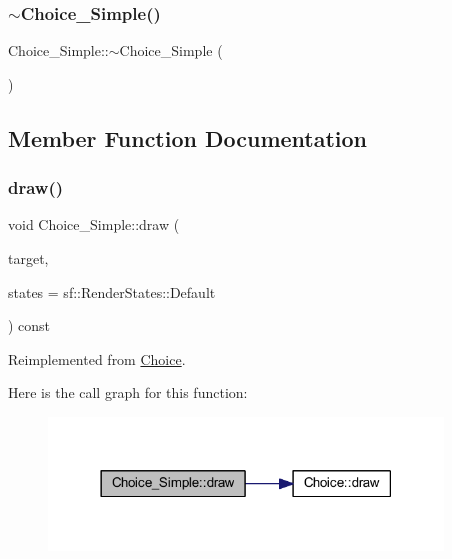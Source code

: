 \mbox{\label{class_choice___simple_a6d5b3fe8aa2969f8eaffa4e5fd3b47d9}} 
\subsubsection{\texorpdfstring{$\sim$\+Choice\+\_\+\+Simple()}{~Choice\_Simple()}}
{\footnotesize\ttfamily Choice\+\_\+\+Simple\+::$\sim$\+Choice\+\_\+\+Simple (\begin{DoxyParamCaption}{ }\end{DoxyParamCaption})\hspace{0.3cm}{\ttfamily [virtual]}}



\subsection{Member Function Documentation}
\mbox{\label{class_choice___simple_ae8f4cedc34a10d3c35efce8cec1bec54}} 
\subsubsection{\texorpdfstring{draw()}{draw()}}
{\footnotesize\ttfamily void Choice\+\_\+\+Simple\+::draw (\begin{DoxyParamCaption}\item[{sf\+::\+Render\+Target \&}]{target,  }\item[{sf\+::\+Render\+States}]{states = {\ttfamily sf\+:\+:RenderStates\+:\+:Default} }\end{DoxyParamCaption}) const\hspace{0.3cm}{\ttfamily [virtual]}}



Reimplemented from \hyperlink{class_choice_ad6a03ce8c892eacabef3691feba37b0f}{Choice}.

Here is the call graph for this function\+:
\nopagebreak
\begin{figure}[H]
\begin{center}
\leavevmode
\includegraphics[width=297pt]{class_choice___simple_ae8f4cedc34a10d3c35efce8cec1bec54_cgraph}
\end{center}
\end{figure}
\mbox{\label{class_choice___simple_a035e32f90e4561b666b6571bce06e207}} 
